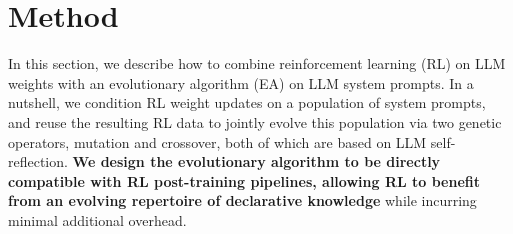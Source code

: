 \documentclass{article}
\theoremstyle{plain}
\theoremstyle{definition}
\theoremstyle{remark}
\begin{document}
\section{Method}

In this section, we describe how to combine reinforcement learning (RL) on LLM weights with an evolutionary algorithm (EA) on LLM system prompts. In a nutshell, we condition RL weight updates on a population of system prompts, and reuse the resulting RL data to jointly evolve this population via two genetic operators, mutation and crossover, both of which are based on LLM self-reflection.
\textbf{We design the evolutionary algorithm to be directly compatible with RL post-training pipelines, allowing RL to benefit from an evolving repertoire of declarative knowledge} while incurring minimal additional overhead.

\vspace{-5pt}
\end{document}
